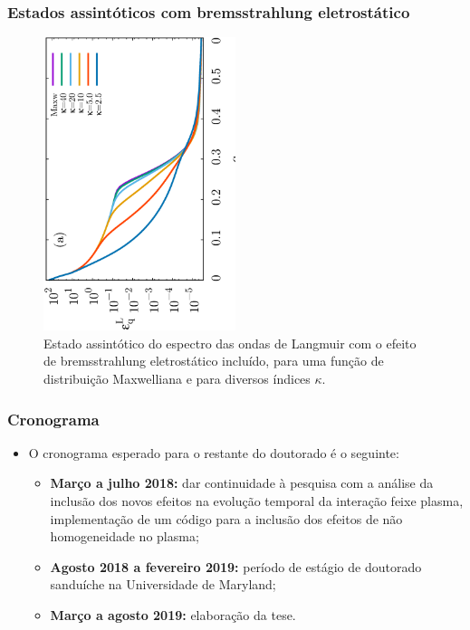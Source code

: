 \documentclass[10pt,aspectratio=1610,lualatex]{beamer}
\begin{document}
\begin{frame}
  \frametitle{Estados assintóticos com bremsstrahlung
  eletrostático}
  \begin{figure}
    \centering\includegraphics[width=0.5\textwidth,angle=270]{IL1D_005kvar}
    \caption*{Estado assintótico do espectro das ondas de Langmuir com o
      efeito de bremsstrahlung eletrostático incluído, para uma função de
      distribuição Maxwelliana e para diversos índices $\kappa$.}
  \end{figure}
\end{frame}

\begin{frame}
  \frametitle{Cronograma}
  \begin{itemize}
    \item O cronograma esperado para o restante do doutorado
    é o seguinte:
    \vspace{0.25cm}
    \begin{itemize}
      \item \textbf{Março a julho 2018:}
      dar continuidade à pesquisa com a análise da inclusão dos
      novos efeitos na evolução temporal da interação feixe plasma,
      implementação de um código para a inclusão dos efeitos de
      não homogeneidade no plasma;
      \vspace{0.2cm}
      \item \textbf{Agosto 2018 a fevereiro 2019:}
      período de estágio de doutorado sanduíche na Universidade de
      Maryland;
      \vspace{0.2cm}
      \item \textbf{Março a agosto 2019:} elaboração da tese.
    \end{itemize}
  \end{itemize}
\end{frame}
\end{document}
